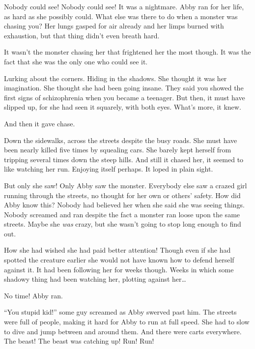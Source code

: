 Nobody could see! Nobody could see! It was a nightmare. Abby ran
for her life, as hard as she possibly could. What else was there to
do when a monster was chasing you? Her lungs gasped for air already
and her limps burned with exhaustion, but that thing didn't even
breath hard.



It wasn't the monster chasing her that frightened her the most
though. It was the fact that she was the only one who could see
it.



Lurking about the corners. Hiding in the shadows. She thought it
was her imagination. She thought she had been going insane. They
said you showed the first signs of schizophrenia when you became a
teenager. But then, it must have slipped up, for she had seen it
squarely, with both eyes. What's more, it knew.



And then it gave chase.



Down the sidewalks, across the streets despite the busy roads. She
must have been nearly killed five times by squealing cars. She
barely kept herself from tripping several times down the steep
hills. And still it chased her, it seemed to like watching her run.
Enjoying itself perhaps. It loped in plain sight.



But only she saw! Only Abby saw the monster. Everybody else saw a
crazed girl running through the streets, no thought for her own or
others' safety. How did Abby know this? Nobody had believed her
when she said she was seeing things. Nobody screamed and ran
despite the fact a monster ran loose upon the same streets. Maybe
she {\em was} crazy, but she wasn't going to stop long enough to
find out.



How she had wished she had paid better attention! Though even if
she had spotted the creature earlier she would not have known how
to defend herself against it. It had been following her for weeks
though. Weeks in which some shadowy thing had been watching her,
plotting against her{\ldots}



No time! Abby ran.



``You stupid kid!'' some guy screamed as Abby swerved past him. The
streets were full of people, making it hard for Abby to run at full
speed. She had to slow to dive and jump between and around them.
And there were carts everywhere. The beast! The beast was catching
up! Run! Run!




